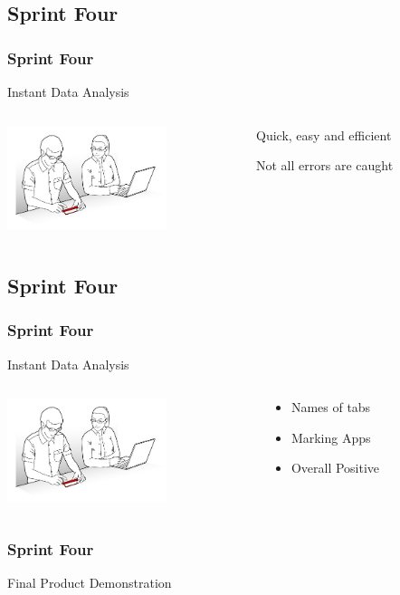 \subsection{Sprint Four}
\begin{frame}
\frametitle{Sprint Four}
\begin{center}
Instant Data Analysis\\
\begin{columns}
\begin{column}{0.5\textwidth}
\includegraphics[height=3cm]{images/usertest}
\end{column}
\begin{column}{0.5\textwidth}

\begin{description}
\item<1>[Strengths:] Quick, easy and efficient
\item<2>[Weaknesses:] Not all errors are caught
\end{description}

\end{column}
\end{columns}
\end{center}
\end{frame}
\subsection{Sprint Four}
\begin{frame}
\frametitle{Sprint Four}
\begin{center}
Instant Data Analysis\\
\begin{columns}
\begin{column}{0.5\textwidth}
\includegraphics[height=3cm]{images/usertest}
\end{column}
\begin{column}{0.5\textwidth}

\begin{itemize}
\item<1>Names of tabs
\item<2>Marking Apps
\item<3>Overall Positive
\end{itemize}

\end{column}
\end{columns}
\end{center}
\end{frame}

\begin{frame}

\frametitle{Sprint Four}
\begin{center}
Final Product Demonstration
\end{center}
\end{frame}